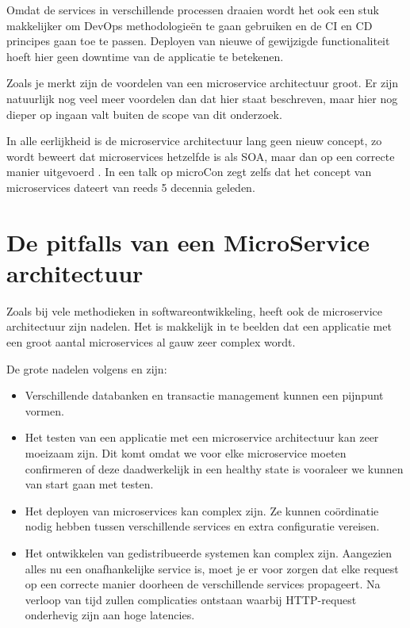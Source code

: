 Omdat de services in verschillende processen draaien wordt het ook een stuk makkelijker om \gls{DevOps} methodologieën te gaan gebruiken en de \gls{CI} en \gls{CD} principes gaan toe te passen. Deployen van nieuwe of gewijzigde functionaliteit hoeft hier geen downtime van de applicatie te betekenen.

Zoals je merkt zijn de voordelen van een microservice architectuur groot. Er zijn natuurlijk nog veel meer voordelen dan dat hier staat beschreven, maar hier nog dieper op ingaan valt buiten de scope van dit onderzoek.

In alle eerlijkheid is de microservice architectuur lang geen nieuw concept, zo  wordt beweert dat microservices hetzelfde is als \gls{SOA}, maar dan op een correcte manier uitgevoerd \autocite{Morris2014} \autocite{Young2016}. In een talk op microCon zegt \textcite{Young2016} zelfs dat het concept van microservices dateert van reeds 5 decennia geleden.

\section{De pitfalls van een MicroService architectuur}
Zoals bij vele methodieken in softwareontwikkeling, heeft ook de microservice architectuur zijn nadelen. Het is makkelijk in te beelden dat een applicatie met een groot aantal microservices al gauw zeer complex wordt.

De grote nadelen volgens \textcite{Fowler2015} en \textcite{Hummel2018} zijn:

\begin{itemize}
	\item Verschillende databanken en transactie management kunnen een pijnpunt vormen.
	\item Het testen van een applicatie met een microservice architectuur kan zeer moeizaam zijn. Dit komt omdat we voor elke microservice moeten confirmeren of deze daadwerkelijk in een healthy state is vooraleer we kunnen van start gaan met testen.
	\item Het deployen van microservices kan complex zijn. Ze kunnen coördinatie nodig hebben tussen verschillende services en extra configuratie vereisen.
	\item Het ontwikkelen van \gls{gedistribueerde systemen} kan complex zijn. Aangezien alles nu een onafhankelijke service is, moet je er voor zorgen dat elke request op een correcte manier doorheen de verschillende services propageert. Na verloop van tijd zullen complicaties ontstaan waarbij \gls{HTTP-request} onderhevig zijn aan hoge \gls{latencies}.
\end{itemize}

